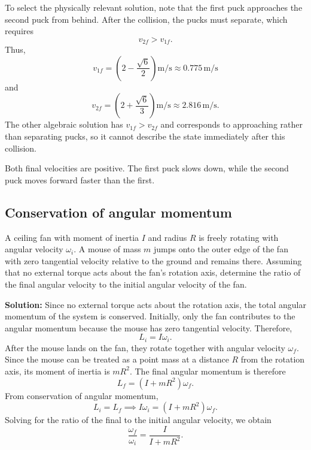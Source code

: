 \documentclass[12pt]{article}
\begin{document}
To select the physically relevant solution, note that the first puck
approaches the second puck from behind. After the collision, the pucks
must separate, which requires
\begin{equation}
    v_{2f}>v_{1f}.
\end{equation}
Thus,
\begin{equation}
    \boxed{
    v_{1f}
    = \left(2-\frac{\sqrt{6}}{2}\right)\mathrm{m/s}
    \approx 0.775\,\mathrm{m/s}
    }
\end{equation}
and
\begin{equation}
    \boxed{
    v_{2f}
    = \left(2+\frac{\sqrt{6}}{3}\right)\mathrm{m/s}
    \approx 2.816\,\mathrm{m/s}
    }.
\end{equation}
The other algebraic solution has $v_{1f}>v_{2f}$ and corresponds to
approaching rather than separating pucks, so it cannot describe the
state immediately after this collision.

Both final velocities are positive. The first puck slows down,
while the second puck moves forward faster than the first.



\subsection{Conservation of angular momentum}

A ceiling fan with moment of inertia $I$ and radius $R$ is freely rotating with angular velocity $\omega_i$. A mouse of mass $m$ jumps onto the outer edge of the fan
with zero tangential velocity relative to the ground and remains there. Assuming that no external torque acts about the fan's rotation axis, determine the ratio of the final angular velocity to the initial angular
velocity of the fan.

\textbf{Solution:}
Since no external torque acts about the rotation axis, the total angular momentum of the system is conserved. Initially, only the fan contributes to the angular momentum because the mouse has zero tangential velocity. Therefore,
\begin{equation}
    L_i = I\omega_i.
\end{equation}
After the mouse lands on the fan, they rotate together with angular velocity $\omega_f$. Since the mouse can be treated as a point mass at a distance $R$ from the rotation axis, its moment of inertia is $mR^2$. The final angular momentum is therefore
\begin{equation}
    L_f = (I+mR^2)\omega_f.
\end{equation}
From conservation of angular momentum,
\begin{equation}
    L_i = L_f
    \implies
    I\omega_i = (I+mR^2)\omega_f.
\end{equation}
Solving for the ratio of the final to the initial angular velocity, we obtain
\begin{equation}
    \boxed{
    \frac{\omega_f}{\omega_i}
    = \frac{I}{I+mR^2}
    }.
\end{equation}
\end{document}
